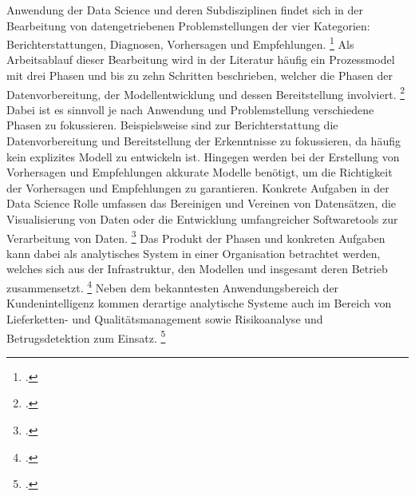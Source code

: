 Anwendung der Data Science und deren Subdisziplinen findet sich in der Bearbeitung von datengetriebenen Problemstellungen der vier Kategorien: Berichterstattungen, Diagnosen, Vorhersagen und Empfehlungen. \footcite[prenote][postnote]{four main categories}
Als Arbeitsablauf dieser Bearbeitung wird in der Literatur häufig ein Prozessmodel mit drei Phasen und bis zu zehn Schritten beschrieben, welcher die Phasen der Datenvorbereitung, der Modellentwicklung und dessen Bereitstellung involviert. \footcite[prenote][postnote]{data science process as roughly 3}
Dabei ist es sinnvoll je nach Anwendung und Problemstellung verschiedene Phasen zu fokussieren.
Beispielsweise sind zur Berichterstattung die Datenvorbereitung und Bereitstellung der Erkenntnisse zu fokussieren, da häufig kein explizites Modell zu entwickeln ist.
Hingegen werden bei der Erstellung von Vorhersagen und Empfehlungen akkurate Modelle benötigt, um die Richtigkeit der Vorhersagen und Empfehlungen zu garantieren.
Konkrete Aufgaben in der Data Science Rolle umfassen das Bereinigen und Vereinen von Datensätzen, die Visualisierung von Daten oder die Entwicklung umfangreicher Softwaretools zur Verarbeitung von Daten. \footcite[prenote][postnote]{tasks of a data scientist}
Das Produkt der Phasen und konkreten Aufgaben kann dabei als analytisches System in einer Organisation betrachtet werden, welches sich aus der Infrastruktur, den Modellen und insgesamt deren Betrieb zusammensetzt. \footcite[prenote][postnote]{analytics functions in an orga}
Neben dem bekanntesten Anwendungsbereich der Kundenintelligenz kommen derartige analytische Systeme auch im Bereich von Lieferketten- und Qualitätsmanagement sowie Risikoanalyse und Betrugsdetektion zum Einsatz. \footcite[prenote][postnote]{Chapter about BDA applications}
